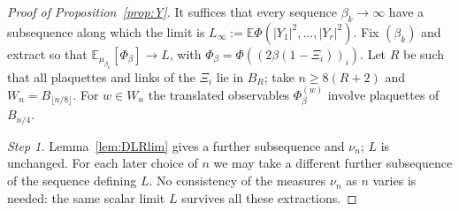 \documentclass[11pt,a4paper]{article}
\theoremstyle{plain}
\theoremstyle{definition}
\theoremstyle{remark}
\numberwithin{equation}{section}
\newcommand{\E}{\mathbb{E}}
\begin{document}
\begin{proof}[Proof of Proposition~\ref{prop:Y}]
It suffices that every sequence $\beta_k\to\infty$ have a subsequence along which the limit is $L_\infty:=\E\Phi(|Y_1|^2,\dots,|Y_r|^2)$.
Fix $(\beta_k)$ and extract so that $\E_{\mu_{\beta_k}}[\Phi_\beta]\to L$, with $\Phi_\beta=\Phi((2\beta(1-\Xi_i))_i)$. Let $R$ be such that all
plaquettes and links of the $\Xi_i$ lie in $B_R$; take $n\ge8(R+2)$ and $W_n=B_{\lfloor n/8\rfloor}$. For $w\in W_n$ the translated
observables $\Phi_\beta^{(w)}$ involve plaquettes of $B_{n/4}$.

\emph{Step 1.} Lemma~\ref{lem:DLRlim} gives a further subsequence and $\nu_n$; $L$ is unchanged.
For each later choice of $n$ we may take a different further subsequence of the sequence defining $L$.
No consistency of the measures $\nu_n$ as $n$ varies is needed: the same scalar limit $L$ survives all these extractions.


\end{proof}
\end{document}
